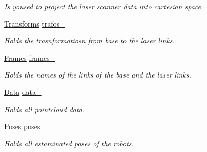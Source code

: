 \begin{DoxyCompactItemize}
\begin{DoxyCompactList}\small\item\em Is yoused to project the laser scanner data into cartesian space. \end{DoxyCompactList}\item 
\hyperlink{structLaserPredictor_1_1Transforms}{Transforms} \hyperlink{classLaserPredictor_a462937a6b7f66cb731f53659fa69c215}{trafos\+\_\+}\hypertarget{classLaserPredictor_a462937a6b7f66cb731f53659fa69c215}{}\label{classLaserPredictor_a462937a6b7f66cb731f53659fa69c215}

\begin{DoxyCompactList}\small\item\em Holds the trasnformatiosn from base to the laser links. \end{DoxyCompactList}\item 
\hyperlink{structLaserPredictor_1_1Frames}{Frames} \hyperlink{classLaserPredictor_a381370876c2606b7aa690959490237f9}{frames\+\_\+}\hypertarget{classLaserPredictor_a381370876c2606b7aa690959490237f9}{}\label{classLaserPredictor_a381370876c2606b7aa690959490237f9}

\begin{DoxyCompactList}\small\item\em Holds the names of the links of the base and the laser links. \end{DoxyCompactList}\item 
\hyperlink{structLaserPredictor_1_1Data}{Data} \hyperlink{classLaserPredictor_a897df6d3a3d9a810ef7b586f83415046}{data\+\_\+}\hypertarget{classLaserPredictor_a897df6d3a3d9a810ef7b586f83415046}{}\label{classLaserPredictor_a897df6d3a3d9a810ef7b586f83415046}

\begin{DoxyCompactList}\small\item\em Holds all pointcloud data. \end{DoxyCompactList}\item 
\hyperlink{classLaserPredictor_a6c7dc6bd4bfb6acd3d95e88e1b9b4be2}{Poses} \hyperlink{classLaserPredictor_a0cffbd5cd61e29cd1e137854935d0072}{poses\+\_\+}\hypertarget{classLaserPredictor_a0cffbd5cd61e29cd1e137854935d0072}{}\label{classLaserPredictor_a0cffbd5cd61e29cd1e137854935d0072}

\begin{DoxyCompactList}\small\item\em Holds all estaminated poses of the robots. \end{DoxyCompactList}\end{DoxyCompactItemize}


